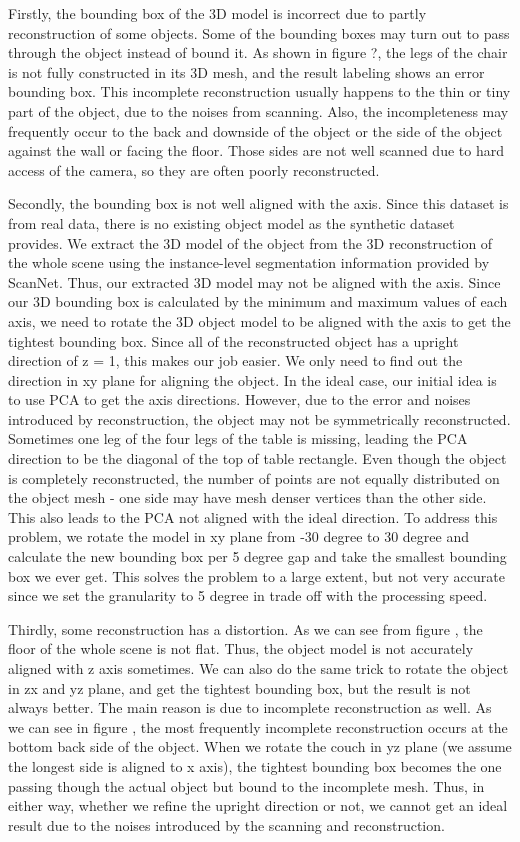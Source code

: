 Firstly, the bounding box of the 3D model is incorrect due to partly reconstruction of some objects. Some of the bounding boxes may turn out to pass through the object instead of bound it. As shown in figure ?, the legs of the chair is not fully constructed in its 3D mesh, and the result labeling shows an error bounding box. This incomplete reconstruction usually happens to the thin or tiny part of the object, due to the noises from scanning. Also, the incompleteness may frequently occur to the back and downside of the object or the side of the object against the wall or facing the floor. Those sides are not well scanned due to hard access of the camera, so they are often poorly reconstructed.

Secondly, the bounding box is not well aligned with the axis. Since this dataset is from real data, there is no existing object model as the synthetic dataset provides. We extract the 3D model of the object from the 3D reconstruction of the whole scene using the instance-level segmentation information provided by ScanNet. Thus, our extracted 3D model may not be aligned with the axis. Since our 3D bounding box is calculated by the minimum and maximum values of each axis, we need to rotate the 3D object model to be aligned with the axis to get the tightest bounding box. Since all of the reconstructed object has a upright direction of z = 1, this makes our job easier. We only need to find out the direction in xy plane for aligning the object. In the ideal case, our initial idea is to use PCA to get the axis directions. However, due to the error and noises introduced by reconstruction, the object may not be symmetrically reconstructed. Sometimes one leg of the four legs of the table is missing, leading the PCA direction to be the diagonal of the top of table rectangle. Even though the object is completely reconstructed, the number of points are not equally distributed on the object mesh - one side may have mesh denser vertices than the other side. This also leads to the PCA not aligned with the ideal direction. To address this problem, we rotate the model in xy plane from -30 degree to 30 degree and calculate the new bounding box per 5 degree gap and take the smallest bounding box we ever get. This solves the problem to a large extent, but not very accurate since we set the granularity to 5 degree in trade off with the processing speed.

Thirdly, some reconstruction has a distortion. As we can see from figure , the floor of the whole scene is not flat. Thus, the object model is not accurately aligned with z axis sometimes. We can also do the same trick to rotate the object in zx and yz plane, and get the tightest bounding box, but the result is not always better. The main reason is due to incomplete reconstruction as well. As we can see in figure , the most frequently incomplete reconstruction occurs at the bottom back side of the object. When we rotate the couch in yz plane (we assume the longest side is aligned to x axis), the tightest bounding box becomes the one passing though the actual object but bound to the incomplete mesh. Thus, in either way, whether we refine the upright direction or not, we cannot get an ideal result due to the noises introduced by the scanning and reconstruction.

